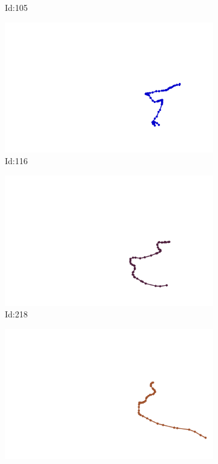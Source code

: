 \documentclass[12pt,twoside]{report}
\begin{document}
\begin{figure}
\begin{subfigure}[b]{0.20\textwidth}
\caption{Id:105}
\end{subfigure}
\begin{subfigure}[b]{0.20\textwidth}
\centering
\includegraphics[width=\textwidth]{../trajectories/116.png}
\caption{Id:116}
\end{subfigure}
\begin{subfigure}[b]{0.20\textwidth}
\centering
\includegraphics[width=\textwidth]{../trajectories/218.png}
\caption{Id:218}
\end{subfigure}
\begin{subfigure}[b]{0.20\textwidth}
\centering
\includegraphics[width=\textwidth]{../trajectories/331.png}

\end{subfigure}
\end{figure}
\end{document}
